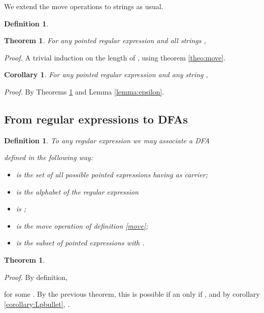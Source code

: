 \documentclass[preprint]{sigplanconf}
\newcounter{item}
\newtheorem{theorem}[item]{Theorem}
\newtheorem{definition}[item]{Definition}
\newtheorem{corollary}[item]{Corollary}
\newenvironment{proof}{\begin{trivlist}\item[]{\em Proof.}}{\end{trivlist}}
\begin{document}
We extend the move operations to strings as usual.
\begin{definition}

\end{definition}

\begin{theorem} 
\label{theo:move*}
For any pointed regular expression  and all strings
, 

\end{theorem}
\begin{proof}
A trivial induction on the length of , using theorem \ref{theo:move}.
\end{proof}

\begin{corollary}
For any pointed regular expression  and any string
, 

\end{corollary}
\begin{proof}
By Theorems \ref{theo:move*} and Lemma \ref{lemma:epsilon}.
\end{proof}

\subsection{From regular expressions to DFAs}

\begin{definition}
To any regular expression  we may associate a DFA 
 
defined in the following way:
\begin{itemize}
\item  is the set of all possible pointed expressions having  as
carrier;
\item  is the alphabet of the regular expression
\item  is ;
\item  is the move operation of definition \ref{move};
\item  is the subset of pointed expressions  
with .
\end{itemize}
\end{definition}

\begin{theorem} 
\label{theo:main}

\end{theorem}
 \begin{proof}
By definition, 

for some . By the previous theorem, this is possible if an only if
, and by corollary \ref{corollary:Lpbullet}, 
.
\end{proof}
\end{document}
